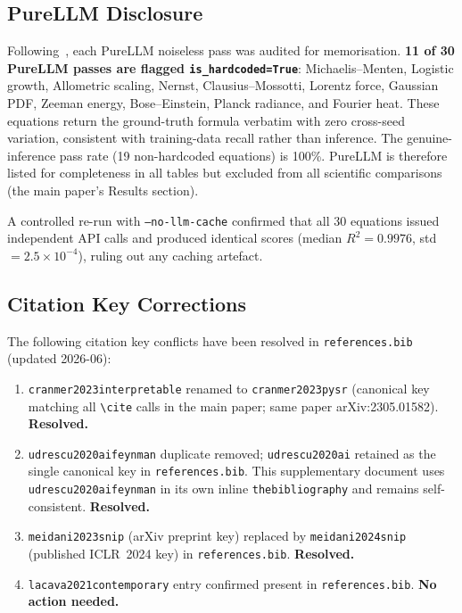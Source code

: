 \documentclass[twoside,11pt]{article}
\begin{document}
\subsection*{PureLLM Disclosure}

Following~\citet{memorization2024audit}, each PureLLM noiseless pass
was audited for memorisation. \textbf{11 of 30 PureLLM passes are
flagged \texttt{is\_hardcoded=True}}: Michaelis--Menten, Logistic growth,
Allometric scaling, Nernst, Clausius--Mossotti, Lorentz force, Gaussian PDF,
Zeeman energy, Bose--Einstein, Planck radiance, and Fourier heat. These
equations return the ground-truth formula verbatim with zero cross-seed
variation, consistent with training-data recall rather than inference.
The genuine-inference pass rate (19 non-hardcoded equations) is 100\%.
PureLLM is therefore listed for completeness in all tables but excluded
from all scientific comparisons (the main paper's Results section).

A controlled re-run with \texttt{--no-llm-cache} confirmed that all
30 equations issued independent API calls and produced identical scores
(median $R^2=0.9976$, std $=2.5\times10^{-4}$), ruling out any
caching artefact.

\subsection*{Citation Key Corrections}

The following citation key conflicts have been resolved in \texttt{references.bib}
(updated 2026-06):

\begin{enumerate}
  \item \texttt{cranmer2023interpretable} renamed to \texttt{cranmer2023pysr}
        (canonical key matching all \texttt{\textbackslash cite} calls in the main paper;
        same paper arXiv:2305.01582). \textbf{Resolved.}
  \item \texttt{udrescu2020aifeynman} duplicate removed; \texttt{udrescu2020ai}
        retained as the single canonical key in \texttt{references.bib}.
        This supplementary document uses \texttt{udrescu2020aifeynman} in its own
        inline \texttt{thebibliography} and remains self-consistent. \textbf{Resolved.}
  \item \texttt{meidani2023snip} (arXiv preprint key) replaced by
        \texttt{meidani2024snip} (published ICLR~2024 key) in
        \texttt{references.bib}. \textbf{Resolved.}
  \item \texttt{lacava2021contemporary} entry confirmed present in
        \texttt{references.bib}. \textbf{No action needed.}
\end{enumerate}
\end{document}
